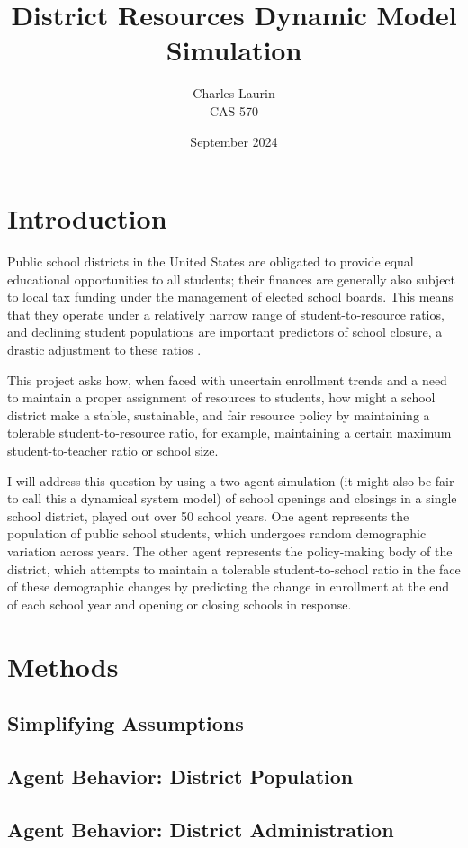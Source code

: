 \documentclass{article}
\title{District Resources Dynamic Model Simulation}
\author{Charles Laurin \\CAS 570}
\date{September 2024}
\begin{document}
\maketitle


\section*{Introduction}
Public school districts in the United States are obligated to provide equal educational opportunities to all students; their finances are generally also subject to local tax funding under the management of elected school boards. This means that they operate under a relatively narrow range of student-to-resource ratios, and declining student populations are important predictors of school closure, a drastic adjustment to these ratios \cite{harris2023extreme}. 

This project asks how, when faced with uncertain enrollment trends and a need to maintain a proper assignment of resources to students, how might a school district make a stable, sustainable, and fair resource policy by maintaining a tolerable student-to-resource ratio, for example, maintaining a certain maximum student-to-teacher ratio or school size.

I will address this question by using a two-agent simulation (it might also be fair to call this a dynamical system model) of school openings and closings in a single school district, played out over 50 school years. One agent represents the population of public school students, which undergoes random demographic variation across years. The other agent represents the policy-making body of the district, which attempts to maintain a tolerable student-to-school ratio in the face of these demographic changes by predicting the change in enrollment at the end of each school year and opening or closing schools in response.

\section*{Methods}
\subsection*{Simplifying Assumptions}
\subsection*{Agent Behavior: District Population}
\subsection*{Agent Behavior: District Administration}
\cite{snyder1999understanding}
\cite{fogel1999inductive}
\end{document}
